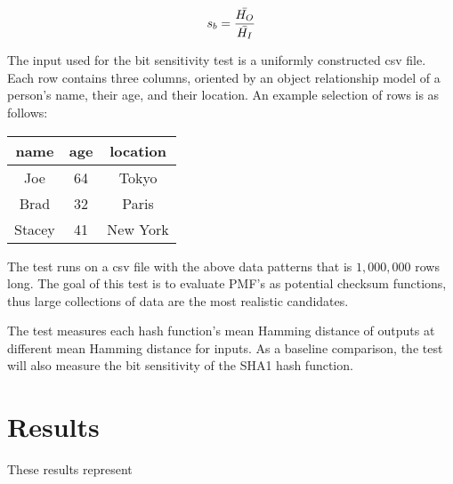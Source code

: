 \documentclass{article}
\begin{document}
$$
   s_b = \frac{\Bar{H_O}}{\Bar{H_I}}
$$

The input used for the bit sensitivity test is a uniformly constructed csv file. Each row contains three columns, oriented by an object relationship model of a person's name, their age, and their location. An example selection of rows is as follows:

\vspace{5}
\begin{tabular}{ c  c  c }
  name & age & location \\
  \hline
  Joe & 64 & Tokyo \\
  Brad & 32 & Paris \\
  Stacey & 41 & New York \\
\end{tabular}

The test runs on a csv file with the above data patterns that is $1,000,000$ rows long. The goal of this test is to evaluate PMF's as potential checksum functions, thus large collections of data are the most realistic candidates.

The test measures each hash function's mean Hamming distance of outputs at different mean Hamming distance for inputs. As a baseline comparison, the test will also measure the bit sensitivity of the SHA1 hash function. 

\section{Results}

These results represent 

\end{document}
